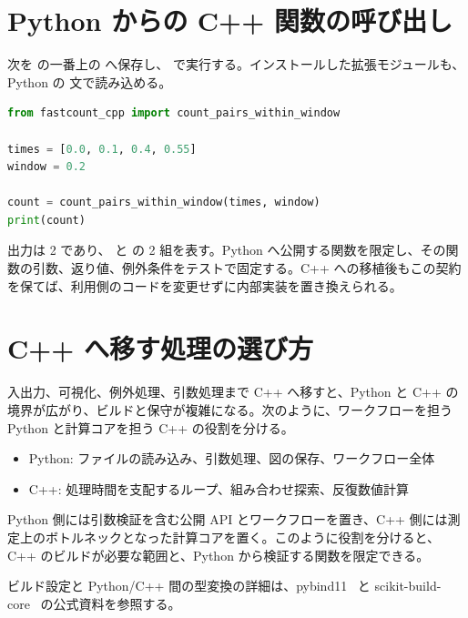 \section{Python からの C++ 関数の呼び出し}

次を  の一番上の  へ保存し、 で実行する。インストールした拡張モジュールも、Python の  文で読み込める。

\begin{lstlisting}[language=Python]
from fastcount_cpp import count_pairs_within_window

times = [0.0, 0.1, 0.4, 0.55]
window = 0.2

count = count_pairs_within_window(times, window)
print(count)
\end{lstlisting}

出力は 2 であり、 と  の 2 組を表す。Python へ公開する関数を限定し、その関数の引数、返り値、例外条件をテストで固定する。C++ への移植後もこの契約を保てば、利用側のコードを変更せずに内部実装を置き換えられる。

\section{C++ へ移す処理の選び方}

入出力、可視化、例外処理、引数処理まで C++ へ移すと、Python と C++ の境界が広がり、ビルドと保守が複雑になる。次のように、ワークフローを担う Python と計算コアを担う C++ の役割を分ける。

\begin{itemize}
\item Python: ファイルの読み込み、引数処理、図の保存、ワークフロー全体
\item C++: 処理時間を支配するループ、組み合わせ探索、反復数値計算
\end{itemize}

Python 側には引数検証を含む公開 API とワークフローを置き、C++ 側には測定上のボトルネックとなった計算コアを置く。このように役割を分けると、C++ のビルドが必要な範囲と、Python から検証する関数を限定できる。

ビルド設定と Python/C++ 間の型変換の詳細は、pybind11~\cite{pybind11_docs} と scikit-build-core~\cite{skbuild_docs} の公式資料を参照する。
